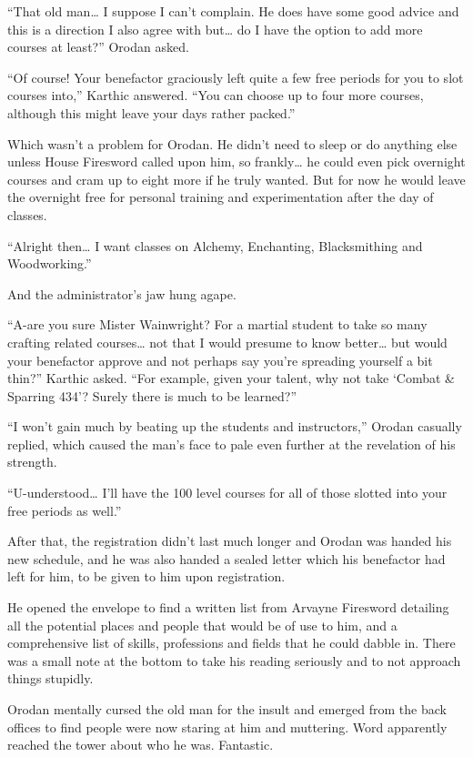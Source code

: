 \documentclass[a4paper,10pt]{book}
\begin{document}
“That old man… I suppose I can’t complain. He does have some good advice and this is a direction I also agree with but… do I have the option to add more courses at least?” Orodan asked.\par
“Of course! Your benefactor graciously left quite a few free periods for you to slot courses into,” Karthic answered. “You can choose up to four more courses, although this might leave your days rather packed.”\par
Which wasn’t a problem for Orodan. He didn’t need to sleep or do anything else unless House Firesword called upon him, so frankly… he could even pick overnight courses and cram up to eight more if he truly wanted. But for now he would leave the overnight free for personal training and experimentation after the day of classes.\par
“Alright then… I want classes on Alchemy, Enchanting, Blacksmithing and Woodworking.”\par
And the administrator’s jaw hung agape.\par
“A-are you sure Mister Wainwright? For a martial student to take so many crafting related courses… not that I would presume to know better… but would your benefactor approve and not perhaps say you’re spreading yourself a bit thin?” Karthic asked. “For example, given your talent, why not take ‘Combat \& Sparring 434’? Surely there is much to be learned?”\par
“I won’t gain much by beating up the students and instructors,” Orodan casually replied, which caused the man’s face to pale even further at the revelation of his strength.\par
“U-understood… I’ll have the 100 level courses for all of those slotted into your free periods as well.”\par
After that, the registration didn’t last much longer and Orodan was handed his new schedule, and he was also handed a sealed letter which his benefactor had left for him, to be given to him upon registration.\par
He opened the envelope to find a written list from Arvayne Firesword detailing all the potential places and people that would be of use to him, and a comprehensive list of skills, professions and fields that he could dabble in. There was a small note at the bottom to take his reading seriously and to not approach things stupidly.\par
Orodan mentally cursed the old man for the insult and emerged from the back offices to find people were now staring at him and muttering. Word apparently reached the tower about who he was. Fantastic.\par
\end{document}
